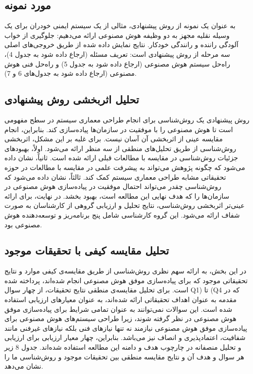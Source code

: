 \documentclass[a4paper,10pt]{article}
\begin{document}
        \subsection{مورد نمونه}

            به عنوان یک نمونه از روش پیشنهادی، مثالی از یک سیستم ایمنی خودران برای یک وسیله نقلیه مجهز به دو وظیفه هوش مصنوعی ارائه می‌دهیم: جلوگیری از خواب آلودگی راننده و رانندگی خودکار. نتایج نمایش داده شده از طریق خروجی‌های اصلی سه مرحله از روش پیشنهادی است: تعریف مسئله (ارجاع داده شود به جدول 4)، راه‌حل سیستم هوش مصنوعی (ارجاع داده شود به جدول 5) و راه‌حل فنی هوش مصنوعی (ارجاع داده شود به جدول‌های 6 و 7).

        \subsection{تحلیل اثربخشی روش پیشنهادی}

            روش پیشنهادی یک روش‌شناسی برای انجام طراحی معماری سیستم در سطح مفهومی است تا هوش مصنوعی را با موفقیت در سازمان‌ها پیاده‌سازی کند. بنابراین، انجام مقایسه عینی از اثربخشی آن آسان نیست. برای غلبه بر این مشکل، اثربخشی روش‌شناسی از طریق تحلیل‌های منطقی از سه منظر ارائه می‌شود. اولاً، بهبودهای جزئیات روش‌شناسی در مقایسه با مطالعات قبلی ارائه شده است. ثانیاً، نشان داده می‌شود که چگونه پژوهش می‌تواند به پیشرفت علمی در مقایسه با مطالعات در حوزه تحقیقاتی مشابه طراحی معماری سیستم کمک کند. ثالثاً، نشان داده می‌شود که روش‌شناسی چقدر می‌تواند احتمال موفقیت در پیاده‌سازی هوش مصنوعی در سازمان‌ها را که هدف نهایی این مطالعه است، بهبود بخشد. در نهایت، برای ارائه عینی‌تر اثربخشی روش‌شناسی، نتایج تحلیل و ارزیابی گروهی از کارشناسان به صورت شفاف ارائه می‌شود. این گروه کارشناسی شامل پنج برنامه‌ریز و توسعه‌دهنده هوش مصنوعی بود.

        \subsection{تحلیل مقایسه کیفی با تحقیقات موجود}

            در این بخش، به ارائه‌ سهم نظری روش‌شناسی از طریق مقایسه‌ی کیفی موارد و نتایج تحقیقاتی موجود که برای پیاده‌سازی موفق هوش مصنوعی انجام شده‌اند، پرداخته شده است. برای تحلیل مقایسه‌ی منطقی نتایج تحقیقات، از چهار سوال Q1) تا (Q4 که در مقدمه به عنوان اهداف تحقیقاتی ارائه شده‌اند، به عنوان معیارهای ارزیابی استفاده شده است. این سوالات نمی‌توانند به عنوان تمامی شرایط برای پیاده‌سازی موفق هوش مصنوعی در نظر گرفته شوند، زیرا طراحی سیستم‌های هوش مصنوعی برای پیاده‌سازی موفق هوش مصنوعی نیازمند نه تنها نیازهای فنی بلکه نیازهای غیرفنی مانند شفافیت، اعتمادپذیری و انصاف نیز می‌باشد. بنابراین، چهار معیار ارزیابی برای ارزیابی و تحلیل منصفانه در چارچوب هدف و دامنه این مطالعه استفاده شده‌اند. جدول 8 زیر هر سوال و هدف آن و نتایج مقایسه منطقی بین تحقیقات موجود و روش‌شناسی ما را نشان می‌دهد.
\end{document}
